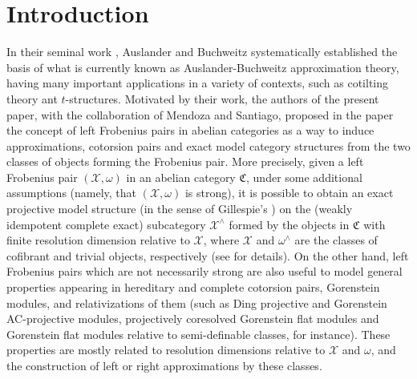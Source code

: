 \documentclass[10pt,reqno]{amsart}
\numberwithin{equation}{section}
\theoremstyle{remark}
\newcommand{\C}{\mathfrak{C}}
\newcommand{\X}{\mathcal{X}}
\begin{document}
\section*{\textbf{Introduction}}

In their seminal work \cite{AB89}, Auslander and Buchweitz systematically established the basis of what is currently known as  Auslander-Buchweitz approximation theory, having many important applications in a variety of contexts, such as cotilting theory ant $t$-structures. Motivated by their work, the authors of the present paper, with the collaboration of Mendoza and Santiago, proposed in the paper \cite{BMSP} the concept of left Frobenius pairs in abelian categories as a way to induce approximations, cotorsion pairs and exact model category structures from the two classes of objects forming the Frobenius pair. More precisely, given a left Frobenius pair $(\mathcal{X},\omega)$ in an abelian category $\mathfrak{C}$, under some additional assumptions (namely, that $(\mathcal{X},\omega)$ is strong), it is possible to obtain an exact projective model structure (in the sense of Gillespie's \cite[Def. 3.1]{GillespieExact}) on the (weakly idempotent complete exact) subcategory $\X^\wedge$ formed by the objects in $\C$ with finite resolution dimension relative to $\X$, where $\mathcal{X}$ and $\omega^\wedge$ are the classes of cofibrant and trivial objects, respectively (see \cite[Thm. 4.1]{BMSP} for details). On the other hand, left Frobenius pairs which are not necessarily strong are also useful to model general properties appearing in hereditary and complete cotorsion pairs, Gorenstein modules, and relativizations of them (such as Ding projective and Gorenstein AC-projective modules, projectively coresolved Gorenstein flat modules and Gorenstein flat modules relative to semi-definable classes, for instance). These properties are mostly related to resolution dimensions relative to $\X$ and $\omega$, and the construction of left or right approximations by these classes. 
\end{document}
